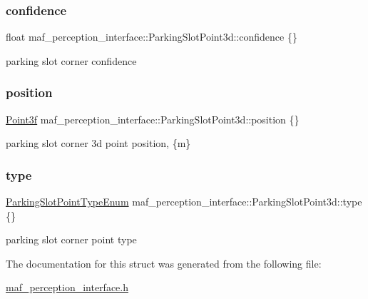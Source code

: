 \subsubsection{\texorpdfstring{confidence}{confidence}}
{\footnotesize\ttfamily float maf\+\_\+perception\+\_\+interface\+::\+Parking\+Slot\+Point3d\+::confidence \{\}}



parking slot corner confidence 

\mbox{\label{structmaf__perception__interface_1_1ParkingSlotPoint3d_a31bb8ee504963fd50971f7d7937275d1}} 
\subsubsection{\texorpdfstring{position}{position}}
{\footnotesize\ttfamily \hyperlink{structmaf__perception__interface_1_1Point3f}{Point3f} maf\+\_\+perception\+\_\+interface\+::\+Parking\+Slot\+Point3d\+::position \{\}}



parking slot corner 3d point position, \{m\} 

\mbox{\label{structmaf__perception__interface_1_1ParkingSlotPoint3d_a0357ad8818b551c18866d42d37bc8df0}} 
\subsubsection{\texorpdfstring{type}{type}}
{\footnotesize\ttfamily \hyperlink{structmaf__perception__interface_1_1ParkingSlotPointTypeEnum}{Parking\+Slot\+Point\+Type\+Enum} maf\+\_\+perception\+\_\+interface\+::\+Parking\+Slot\+Point3d\+::type \{\}}



parking slot corner point type 



The documentation for this struct was generated from the following file\+:\begin{DoxyCompactItemize}
\item 
\hyperlink{maf__perception__interface_8h}{maf\+\_\+perception\+\_\+interface.\+h}\end{DoxyCompactItemize}
